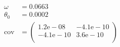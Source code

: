 \begin{align}
	\omega &= 0.0663 \\
	\theta_0 &= 0.0002 \\
	\mathrm{cov} &=
	\begin{pmatrix}
		1.2\mathrm{e}-08 &-4.1\mathrm{e}-10 \\
		-4.1\mathrm{e}-10 &3.6\mathrm{e}-10 \\
	\end{pmatrix} 
\end{align}

